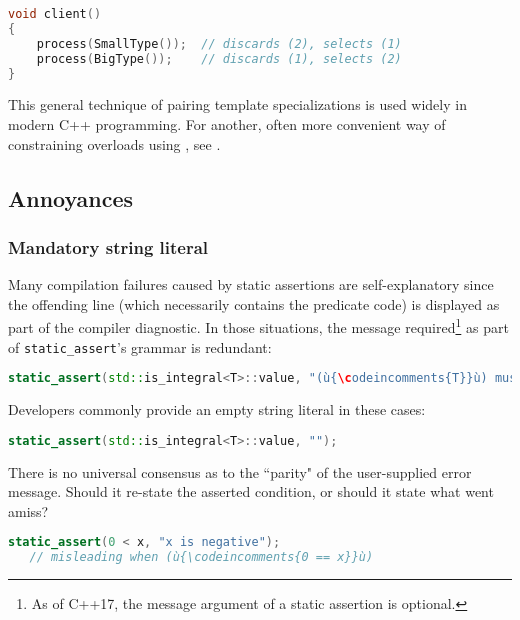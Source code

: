 \begin{lstlisting}[language=C++]
void client()
{
    process(SmallType());  // discards (2), selects (1)
    process(BigType());    // discards (1), selects (2)
}
\end{lstlisting}

\noindent This general technique of pairing template specializations is used widely
in modern C++ programming. For another, often more convenient way of
constraining overloads using , see
.

\subsection[Annoyances]{Annoyances}\label{static-annoyances}

\subsubsection[Mandatory string literal]{Mandatory string literal}\label{mandatory-string-literal}

Many compilation failures caused by static assertions are
self-explanatory since the offending line (which necessarily contains the
predicate code) is displayed as part of the compiler diagnostic. In
those situations, the message required{\cprotect\footnote{As of C++17,
  the message argument of a static assertion is optional.}} as part of
\lstinline!static_assert!'s grammar is redundant:

\begin{lstlisting}[language=C++]
static_assert(std::is_integral<T>::value, "(ù{\codeincomments{T}}ù) must be an integral type.");
\end{lstlisting}

\noindent Developers commonly provide an empty string literal in these
cases:

\begin{lstlisting}[language=C++]
static_assert(std::is_integral<T>::value, "");
\end{lstlisting}

There is no universal consensus as to the ``parity" of the user-supplied error message.  Should it re-state the asserted condition, or should it state what went amiss?
\begin{lstlisting}[language=C++]
static_assert(0 < x, "x is negative");
   // misleading when (ù{\codeincomments{0 == x}}ù)
\end{lstlisting}

